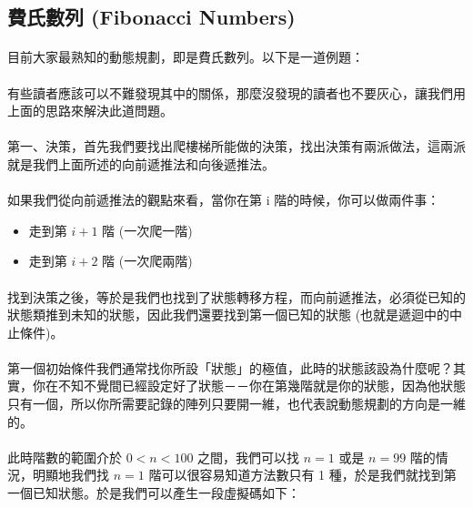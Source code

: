 \documentclass[12pt,a4paper,oneside]{report}
\begin{document}
\begin{CJK}{UTF8}{bkai}
\subsection{費氏數列 (Fibonacci Numbers)}

\paragraph{}目前大家最熟知的動態規劃，即是費氏數列。以下是一道例題：
\paragraph{}有些讀者應該可以不難發現其中的關係，那麼沒發現的讀者也不要灰心，讓我們用上面的思路來解決此道問題。
\paragraph{}第一、決策，首先我們要找出爬樓梯所能做的決策，找出決策有兩派做法，這兩派就是我們上面所述的向前遞推法和向後遞推法。
\paragraph{}如果我們從向前遞推法的觀點來看，當你在第 i 階的時候，你可以做兩件事：

\begin{itemize}
\item 走到第 $i+1$ 階 (一次爬一階)
\item 走到第 $i+2$ 階 (一次爬兩階)
\end{itemize}

\paragraph{}找到決策之後，等於是我們也找到了狀態轉移方程，而向前遞推法，必須從已知的狀態類推到未知的狀態，因此我們還要找到第一個已知的狀態 (也就是遞迴中的中止條件)。
\paragraph{}第一個初始條件我們通常找你所設「狀態」的極值，此時的狀態該設為什麼呢？其實，你在不知不覺間已經設定好了狀態－－你在第幾階就是你的狀態，因為他狀態只有一個，所以你所需要記錄的陣列只要開一維，也代表說動態規劃的方向是一維的。

\paragraph{}此時階數的範圍介於 $0<n<100$ 之間，我們可以找 $n=1$ 或是 $n=99$ 階的情況，明顯地我們找 $n=1$ 階可以很容易知道方法數只有 1 種，於是我們就找到第一個已知狀態。於是我們可以產生一段虛擬碼如下：


\end{CJK}
\end{document}
